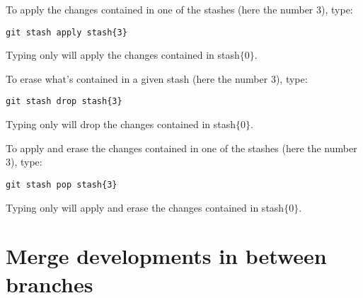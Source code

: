 To apply the changes contained in one of the stashes (here the number 3), type:
\begin{lstlisting}
git stash apply stash{3}
\end{lstlisting}
Typing only  will apply the changes contained in stash$\{0\}$.

To erase what's contained in a given stash (here the number 3), type:
\begin{lstlisting}
git stash drop stash{3}
\end{lstlisting}
Typing only  will drop the changes contained in stash$\{0\}$.

To apply and erase the changes contained in one of the stashes (here the number 3), type:
\begin{lstlisting}
git stash pop stash{3}
\end{lstlisting}
Typing only  will apply and erase the changes contained in stash$\{0\}$.


\section{Merge developments in between branches}

